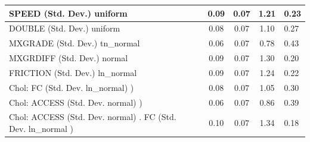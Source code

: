 \begin{table}
\begin{center}
\begin{tabular}{|l|l|c|c|c|l|}
			\hline
			SPEED (Std. Dev.) uniform &  & 0.09 & 0.07 & 1.21 & 0.23 \\
			\hline
			DOUBLE (Std. Dev.) uniform &  & 0.08 & 0.07 & 1.10 & 0.27 \\
			\hline
			MXGRADE (Std. Dev.) tn_normal &  & 0.06 & 0.07 & 0.78 & 0.43 \\
			\hline
			MXGRDIFF (Std. Dev.) normal &  & 0.09 & 0.07 & 1.30 & 0.20 \\
			\hline
			FRICTION (Std. Dev.) ln_normal &  & 0.09 & 0.07 & 1.24 & 0.22 \\
			\hline
			 Chol: FC (Std. Dev. ln_normal) ) &  & 0.08 & 0.07 & 1.05 & 0.30 \\
			\hline
			 Chol: ACCESS (Std. Dev. normal) ) &  & 0.06 & 0.07 & 0.86 & 0.39 \\
			\hline
			 Chol: ACCESS (Std. Dev. normal) . FC (Std. Dev.   ln_normal ) &  & 0.10 & 0.07 & 1.34 & 0.18 \\
			\hline
		\end{tabular}
	\end{center}
\end{table}